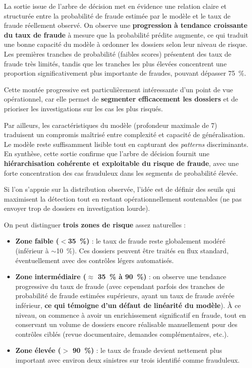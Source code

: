 \clearpage

La sortie issue de l'arbre de décision met en évidence une relation claire et structurée entre la probabilité de fraude estimée par le modèle et le taux de fraude réellement observé. On observe une \textbf{progression à tendance croissante du taux de fraude} à mesure que la probabilité prédite augmente, ce qui traduit une bonne capacité du modèle à ordonner les dossiers selon leur niveau de risque. Les premières tranches de probabilité (faibles scores) présentent des taux de fraude très limités, tandis que les tranches les plus élevées concentrent une proportion significativement plus importante de fraudes, pouvant dépasser 75~\%.

Cette montée progressive est particulièrement intéressante d'un point de vue opérationnel, car elle permet de \textbf{segmenter efficacement les dossiers} et de prioriser les investigations sur les cas les plus risqués.

Par ailleurs, les caractéristiques du modèle (profondeur maximale de 7) traduisent un compromis maîtrisé entre complexité et capacité de généralisation. Le modèle reste suffisamment lisible tout en capturant des \textit{patterns} discriminants. En synthèse, cette sortie confirme que l'arbre de décision fournit une \textbf{hiérarchisation cohérente et exploitable du risque de fraude}, avec une forte concentration des cas frauduleux dans les segments de probabilité élevée.

Si l'on s'appuie sur la distribution observée, l'idée est de définir des seuils qui maximisent la détection tout en restant opérationnellement soutenables (ne pas envoyer trop de dossiers en investigation lourde).

On peut distinguer \textbf{trois zones de risque} assez naturelles :

\begin{itemize}[label = $\bullet$]
    \item \textbf{Zone faible ($<$35~\%)} : le taux de fraude reste globalement modéré (inférieur à $\sim$10~\%). Ces dossiers peuvent être traités en flux standard, éventuellement avec des contrôles légers automatisés.
    \item \textbf{Zone intermédiaire ($\approx$ 35~\% à 90~\%)} : on observe une tendance progressive du taux de fraude (avec cependant parfois des tranches de probabilité de fraude estimées supérieurs, ayant un taux de fraude avérée inférieur, \textbf{ce qui témoigne d'un défaut de linéarité du modèle}).
    À ce niveau, on commence à avoir un enrichissement significatif en fraude, tout en conservant un volume de dossiers encore réalisable manuellement pour des contrôles ciblés (revue documentaire, demandes complémentaires, etc.). 
    \item \textbf{Zone élevée ($>$ 90~\%)} : le taux de fraude devient nettement plus important avec environ deux sinistres sur trois identifié comme frauduleux.
\end{itemize}

